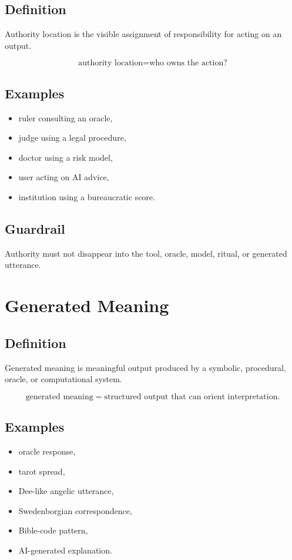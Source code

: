 \documentclass[11pt]{book}
\begin{document}
\subsection*{Definition}

Authority location is the visible assignment of responsibility for acting on an output.

\[
\text{authority location} = \text{who owns the action?}
\]

\subsection*{Examples}

\begin{itemize}
    \item ruler consulting an oracle,
    \item judge using a legal procedure,
    \item doctor using a risk model,
    \item user acting on AI advice,
    \item institution using a bureaucratic score.
\end{itemize}

\subsection*{Guardrail}

Authority must not disappear into the tool, oracle, model, ritual, or generated utterance.

\section{Generated Meaning}

\subsection*{Definition}

Generated meaning is meaningful output produced by a symbolic, procedural, oracle, or computational system.

\[
\text{generated meaning} = \text{structured output that can orient interpretation}.
\]

\subsection*{Examples}

\begin{itemize}
    \item oracle response,
    \item tarot spread,
    \item Dee-like angelic utterance,
    \item Swedenborgian correspondence,
    \item Bible-code pattern,
    \item AI-generated explanation.
\end{itemize}
\end{document}
